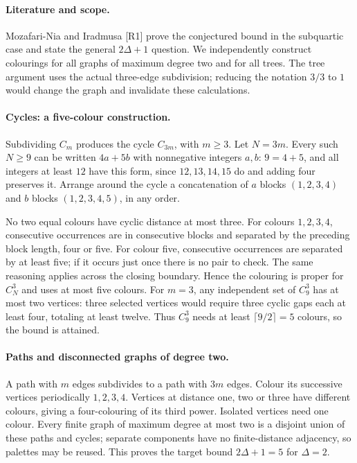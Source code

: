 \documentclass[11pt,a4paper]{article}
\begin{document}
\paragraph{Literature and scope.}
Mozafari-Nia and Iradmusa [R1] prove the conjectured bound in the
subquartic case and state the general $2\Delta+1$ question.
We independently construct colourings for all graphs of maximum
degree two and for all trees. The tree argument uses the actual
three-edge subdivision; reducing the notation $3/3$ to $1$ would
change the graph and invalidate these calculations.

\paragraph{Cycles: a five-colour construction.}
Subdividing $C_m$ produces the cycle $C_{3m}$, with $m\ge3$.
Let $N=3m$. Every such $N\ge9$ can be written $4a+5b$ with
nonnegative integers $a,b$: $9=4+5$, and all integers at least
$12$ have this form, since $12,13,14,15$ do and adding four
preserves it. Arrange around the cycle a concatenation of $a$
blocks $(1,2,3,4)$ and $b$ blocks $(1,2,3,4,5)$, in any order.

No two equal colours have cyclic distance at most three. For
colours $1,2,3,4$, consecutive occurrences are in consecutive
blocks and separated by the preceding block length, four or
five. For colour five, consecutive occurrences are separated by
at least five; if it occurs just once there is no pair to check.
The same reasoning applies across the closing boundary. Hence
the colouring is proper for $C_N^3$ and uses at most five colours.
For $m=3$, any independent set of $C_9^3$ has at most two vertices:
three selected vertices would require three cyclic gaps each at
least four, totaling at least twelve. Thus $C_9^3$ needs at
least $\lceil9/2\rceil=5$ colours, so the bound is attained.

\paragraph{Paths and disconnected graphs of degree two.}
A path with $m$ edges subdivides to a path with $3m$ edges.
Colour its successive vertices periodically $1,2,3,4$. Vertices
at distance one, two or three have different colours, giving
a four-colouring of its third power. Isolated vertices need
one colour. Every finite graph of maximum degree at most two
is a disjoint union of these paths and cycles; separate components
have no finite-distance adjacency, so palettes may be reused.
This proves the target bound $2\Delta+1=5$ for $\Delta=2$.
\end{document}
